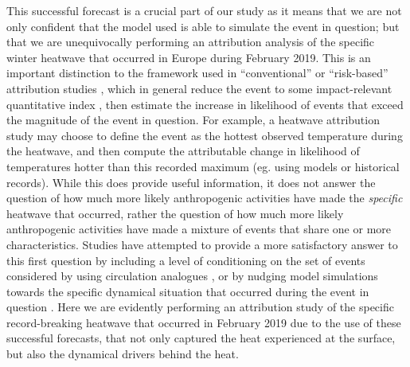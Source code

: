     This successful forecast is a crucial part of our study as it means that we are not only confident that the model used is able to simulate the event in question; but that we are unequivocally performing an attribution analysis of the specific winter heatwave that occurred in Europe during February 2019. This is an important distinction to the framework used in ``conventional'' or ``risk-based'' \citep{shepherd_common_2016} attribution studies \citep{stott_human_2004,pall_anthropogenic_2011,sparrow_attributing_2018,leach_anthropogenic_2020}, which in general reduce the event to some impact-relevant quantitative index , then estimate the increase in likelihood of events that exceed the magnitude of the event in question. For example, a heatwave attribution study may choose to define the event as the hottest observed temperature during the heatwave, and then compute the attributable change in likelihood of temperatures hotter than this recorded maximum (eg. using models or historical records). While this does provide useful information, it does not answer the question of how much more likely anthropogenic activities have made the \emph{specific} heatwave that occurred, rather the question of how much more likely anthropogenic activities have made a mixture of events that share one or more characteristics. Studies have attempted to provide a more satisfactory answer to this first question by including a level of conditioning on the set of events considered by using circulation analogues \citep{yiou_statistical_2017}, or by nudging model simulations towards the specific dynamical situation that occurred during the event in question \citep{meredith_crucial_2015,van_garderen_methodology_2021}. Here we are evidently performing an attribution study of the specific record-breaking heatwave that occurred in February 2019 due to the use of these successful forecasts, that not only captured the heat experienced at the surface, but also the dynamical drivers behind the heat.

